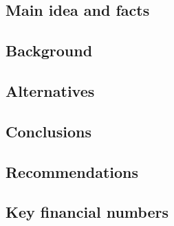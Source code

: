 \subsection*{Main idea and facts}
\subsection*{Background}
\subsection*{Alternatives}
\subsection*{Conclusions}
\subsection*{Recommendations}
\subsection*{Key financial numbers}